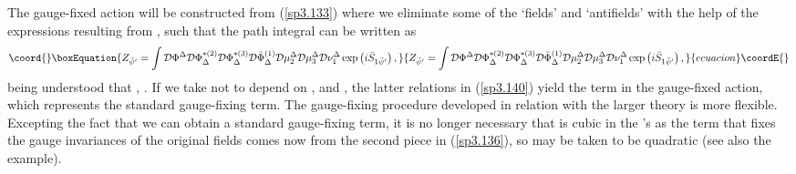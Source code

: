 \documentclass[a4paper,12pt]{article}
\begin{document}
The gauge-fixed action \coordHE{}
will be constructed from (\ref{sp3.133}) where we eliminate some of the
`fields' and `antifields' with the help of the expressions resulting from \myHighlight{$%
\bar{\psi}^{\prime }$}\coordHE{}, such that the path integral can be written as 
\begin{equation}\coord{}\boxEquation{
Z_{\bar{\psi}^{\prime }}=\int \mathcal{D}\Phi ^{\Delta }\mathcal{D}\Phi
_{\Delta }^{*(2)}\mathcal{D}\Phi _{\Delta }^{*(3)}\mathcal{D}\bar{\Phi}
_{\Delta }^{(1)}\mathcal{D}\mu _{2}^{\Delta }\mathcal{D}\mu _{3}^{\Delta }
\mathcal{D}\nu _{1}^{\Delta }\exp \left( i\bar{S}_{1\bar{\psi}^{\prime
}}\right) ,  \label{sp3.141}
}{
Z_{\bar{\psi}^{\prime }}=\int \mathcal{D}\Phi ^{\Delta }\mathcal{D}\Phi
_{\Delta }^{*(2)}\mathcal{D}\Phi _{\Delta }^{*(3)}\mathcal{D}\bar{\Phi}
_{\Delta }^{(1)}\mathcal{D}\mu _{2}^{\Delta }\mathcal{D}\mu _{3}^{\Delta }
\mathcal{D}\nu _{1}^{\Delta }\exp \left( i\bar{S}_{1\bar{\psi}^{\prime
}}\right) ,  }{ecuacion}\coordE{}\end{equation}
being understood that \coordHE{}, \coordHE{}. If we take \myHighlight{$\bar{\psi}
$}\coordHE{} not to depend on \coordHE{}, \coordHE{} and \coordHE{}, the latter relations in (\ref{sp3.140}) yield the term 
\coordHE{} in the
gauge-fixed action, which represents the standard gauge-fixing term. The
gauge-fixing procedure developed in relation with the larger theory is more
flexible. Excepting the fact that we can obtain a standard gauge-fixing
term, it is no longer necessary that \myHighlight{$\bar{\psi}$}\coordHE{} is cubic in the \myHighlight{$\Phi
^{\Delta }$}\coordHE{}'s as the term that fixes the gauge invariances of the original
fields comes now from the second piece in (\ref{sp3.136}), so \myHighlight{$\bar{\psi}$}\coordHE{}
may be taken to be quadratic (see also the example).
\end{document}

